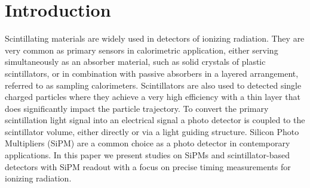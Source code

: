 \section{Introduction}
\label{sec:introduction}

Scintillating materials are widely used in detectors of ionizing radiation. 
They are very common as primary sensors in calorimetric application, 
either serving simultaneously as an absorber material, such as solid crystals of plastic scintillators, 
or in combination with passive absorbers in a layered arrangement, 
referred to as sampling calorimeters. Scintillators are also used to detected single charged 
particles where they achieve a very high efficiency with a thin layer 
that does significantly impact the particle trajectory.
To convert the primary scintillation light signal into an electrical signal 
a photo detector is coupled to the scintillator volume, either directly or 
via a light guiding structure. Silicon Photo Multipliers (SiPM) are a common 
choice as a photo detector in contemporary applications. In this paper we present 
studies on SiPMs and scintillator-based detectors with SiPM readout with a focus on 
precise timing measurements for ionizing radiation. 

